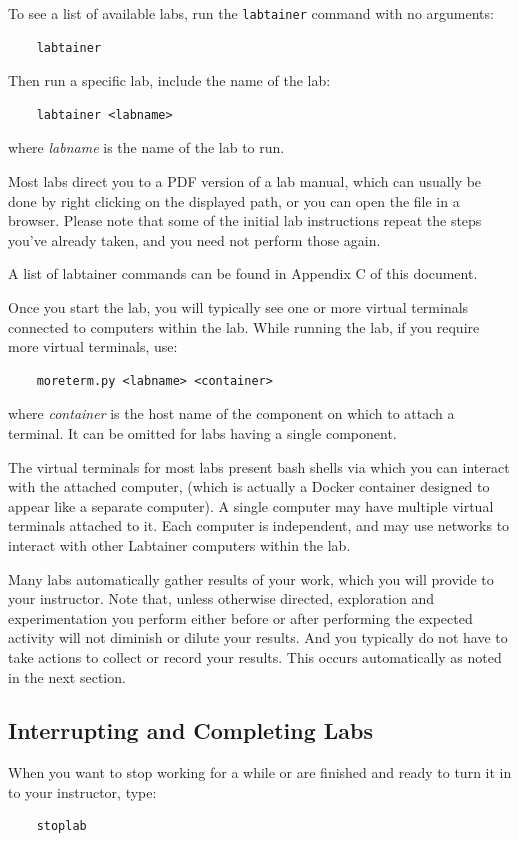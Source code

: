 \documentclass[12pt]{article}
\begin{document}
To see a list of available labs, run the {\tt labtainer} command with no arguments:
\begin{verbatim}
    labtainer 
\end{verbatim}
Then run a specific lab, include the name of the lab:
\begin{verbatim}
    labtainer <labname>
\end{verbatim}
\noindent where \textit{labname} is the name of the lab to run.  

Most labs direct you to a PDF version of a lab manual, which can usually 
be done by right clicking on the displayed path, or you can open the file in a browser.
Please note that some of the initial lab instructions repeat the steps you've already taken, and you need
not perform those again. 

A list of labtainer commands can be found in Appendix C of this document. 

Once you start the lab, you will typically see one or more virtual terminals connected to computers within
the lab.  While running the lab, if you require more virtual terminals, use:
\begin{verbatim}
    moreterm.py <labname> <container>
\end{verbatim}
\noindent where \textit{container} is the host name of the component on which to attach a terminal.  
It can be omitted for labs having a single component.

The virtual terminals for most labs present bash shells via which you can interact
with the attached computer, (which is actually a Docker container designed to appear
like a separate computer).  A single computer
may have multiple virtual terminals attached to it.  Each computer is independent, and 
may use networks to interact with other Labtainer computers within the lab.  

Many labs automatically gather results of your work, which you will provide to your instructor.
Note that, unless otherwise directed, exploration and experimentation you perform either before
or after performing the expected activity will not diminish or dilute your results.  And you typically
do not have to take actions to collect or record your results.  This occurs automatically as noted in the next section.  

\subsection{Interrupting and Completing  Labs}
When you want to stop working for a while or are finished and ready to turn it in to your instructor, type:
\begin{verbatim}
    stoplab
\end{verbatim}
\end{document}
